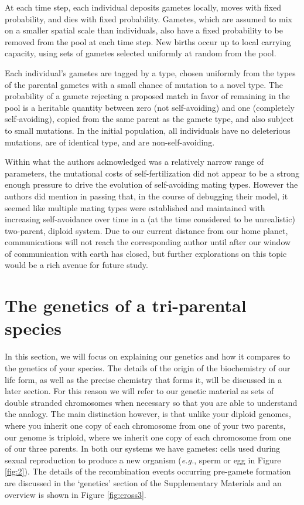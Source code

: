\documentclass{report}
\begin{document}
At each time step, each individual deposits gametes locally, moves with fixed probability, and dies with fixed probability. Gametes, which are assumed to mix on a smaller spatial scale than individuals, also have a fixed probability to be removed from the pool at each time step. New births occur up to local carrying capacity, using sets of gametes selected uniformly at random from the pool.

Each individual’s gametes are tagged by a type, chosen uniformly from the types of the parental gametes with a small chance of mutation to a novel type. The probability of a gamete rejecting a proposed match in favor of remaining in the pool is a heritable quantity between zero (not self-avoiding) and one (completely self-avoiding), copied from the same parent as the gamete type, and also subject to small mutations. In the initial population, all individuals have no deleterious mutations, are of identical type, and are non-self-avoiding.

Within what the authors acknowledged was a relatively narrow range of parameters, the mutational costs of self-fertilization did not appear to be a strong enough pressure to drive the evolution of self-avoiding mating types. However the authors did mention in passing that, in the course of debugging their model, it seemed like multiple mating types were established and maintained with increasing self-avoidance over time in a (at the time considered to be unrealistic) two-parent, diploid system. Due to our current distance from our home planet, communications will not reach the corresponding author until after our window of communication with earth has closed, but further explorations on this topic would be a rich avenue for future study.


\section*{The genetics of a tri-parental species} 

In this section, we will focus on explaining our genetics and how it compares to the genetics of your species. The details of the origin of the biochemistry of our life form, as well as the precise chemistry that forms it, will be discussed in a later section. For this reason we will refer to our genetic material as sets of double stranded chromosomes when necessary so that you are able to understand the analogy. The main distinction however, is that unlike your diploid genomes, where you inherit one copy of each chromosome from one of your two parents, our genome is triploid, where we inherit one copy of each chromosome from one of our three parents. In both our systems we have gametes: cells used during sexual reproduction to produce a new organism (\emph{e.g.}, sperm or egg in Figure \ref{fig:2}). The details of the recombination events occurring pre-gamete formation are discussed in the `genetics' section of the Supplementary Materials and an overview is shown in Figure \ref{fig:cross3}.
\end{document}
